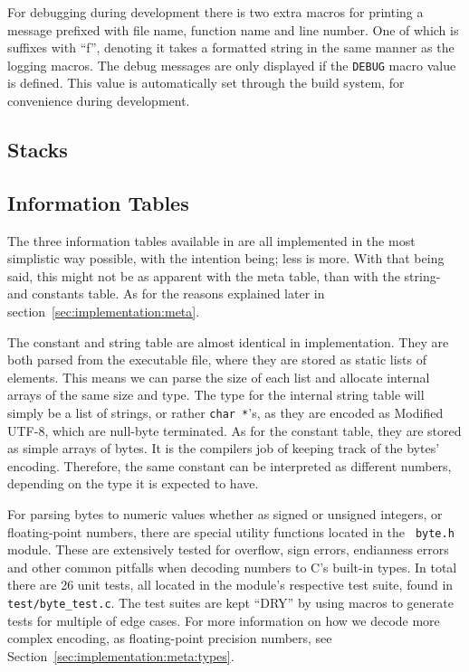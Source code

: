 For debugging during development there is two extra macros for printing a
message prefixed with file name, function name and line number. One of which is
suffixes with ``f'', denoting it takes a formatted string in the same manner as
the logging macros. The debug messages are only displayed if the {\tt DEBUG} macro value is
defined. This value is automatically set through the build system, for
convenience during development.

\subsection{Stacks}
\label{sec:implementation:stacks}


\subsection{Information Tables}
\label{sec:implementation:infotables}

The three information tables available in \thename{} are all implemented in the
most simplistic way possible, with the intention being; less is more. With that
being said, this might not be as apparent with the meta table, than with the
string- and constants table. As for the reasons explained later in
section~\ref{sec:implementation:meta}.

The constant and string table are almost identical in implementation. They are
both parsed from the executable file, where they are stored as static lists of
elements. This means we can parse the size of each list and allocate internal
arrays of the same size and type. The type for the internal string table will
simply be a list of strings, or rather {\tt char *}'s, as they are encoded as
Modified UTF-8, which are null-byte terminated. As for the constant table, they
are stored as simple arrays of bytes. It is the compilers job of keeping track
of the bytes' encoding. Therefore, the same constant can be interpreted as
different numbers, depending on the type it is expected to have.

For parsing bytes to numeric values whether as signed or unsigned integers, or
floating-point numbers, there are special utility functions located in the {\tt
  byte.h} module. These are extensively tested for overflow, sign errors,
endianness errors and other common pitfalls when decoding numbers to C's
built-in types. In total there are 26 unit tests, all located in the module's
respective test suite, found in {\tt test/byte\_test.c}. The test suites are
kept ``DRY'' by using macros to generate tests for multiple of edge cases. For
more information on how we decode more complex encoding, as floating-point
precision numbers, see Section~\ref{sec:implementation:meta:types}.

